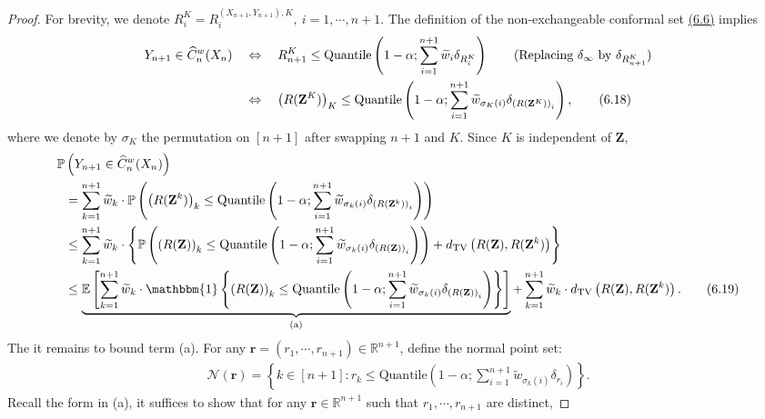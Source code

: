 \documentclass{article}
\numberwithin{equation}{section}
\begin{document}
\begin{proof}
For brevity, we denote $R_i^K = R_i^{(X_{n+1},Y_{n+1}),K},\ i=1,\cdots, n+1.$ The definition of the non-exchangeable conformal set \hyperref[6.6]{(6.6)} implies
\begin{align*}
	Y_{n+1}\in \widehat{C}_n^w(X_n)\quad&\Leftrightarrow\quad R_{n+1}^{K}\leq \mathrm{Quantile}\left(1-\alpha;\sum_{i=1}^{n+1}\widetilde{w}_i\delta_{R_i^K}\right)\tag{Replacing $\delta_\infty$ by $\delta_{R_{n+1}^K}$}\\
	&\Leftrightarrow\quad \left(R(\mathbf{Z}^K)\right)_K \leq\mathrm{Quantile}\left(1-\alpha;\sum_{i=1}^{n+1}\widetilde{w}_{\sigma_K(i)}\delta_{\left(R(\mathbf{Z}^K)\right)_i}\right),\tag{6.18}\label{6.18}
\end{align*}
where we denote by $\sigma_K$ the permutation on $[n+1]$ after swapping $n+1$ and $K$. Since $K$ is independent of $\mathbf{Z}$,
\begin{align*}
	\mathbb{P}&\left(Y_{n+1}\in \widehat{C}_n^w(X_n)\right)\\
	&= \sum_{k=1}^{n+1}\widetilde{w}_k\cdot\mathbb{P}\left(\left(R(\mathbf{Z}^k)\right)_k \leq\mathrm{Quantile}\left(1-\alpha;\sum_{i=1}^{n+1}\widetilde{w}_{\sigma_k(i)}\delta_{\left(R(\mathbf{Z}^k)\right)_i}\right)\right)\\
	&\leq \sum_{k=1}^{n+1}\widetilde{w}_k\cdot\left\{\mathbb{P}\left(\left(R(\mathbf{Z})\right)_k \leq\mathrm{Quantile}\left(1-\alpha;\sum_{i=1}^{n+1}\widetilde{w}_{\sigma_k(i)}\delta_{\left(R(\mathbf{Z})\right)_i}\right)\right) + d_\mathrm{TV}\left(R(\mathbf{Z}),R(\mathbf{Z}^k)\right)\right\}\\
	&\leq \underbrace{\mathbb{E}\left[\sum_{k=1}^{n+1}\widetilde{w}_k\cdot\mathbbm{1}\left\{\left(R(\mathbf{Z})\right)_k \leq\mathrm{Quantile}\left(1-\alpha;\sum_{i=1}^{n+1}\widetilde{w}_{\sigma_k(i)}\delta_{\left(R(\mathbf{Z})\right)_i}\right)\right\}\right]}_{\mathrm{(a)}} +
	\sum_{k=1}^{n+1}\widetilde{w}_k\cdot d_\mathrm{TV}\left(R(\mathbf{Z}),R(\mathbf{Z}^k)\right).\tag{6.19}
\end{align*}
The it remains to bound term (a). For any $\mathbf{r}=(r_1,\cdots,r_{n+1})\in\mathbb{R}^{n+1}$, define the normal point set:
\begin{align*}
	\mathcal{N}(\mathbf{r}) = \left\{k\in[n+1]:r_k \leq \mathrm{Quantile}\left(1-\alpha;\sum_{i=1}^{n+1}\widetilde{w}_{\sigma_k(i)}\delta_{r_i}\right)\right\}.\tag{6.20}\label{6.20}
\end{align*}
Recall the form in (a), it suffices to show that for any $\mathbf{r}\in\mathbb{R}^{n+1}$ such that $r_1,\cdots,r_{n+1}$ are distinct,

\end{proof}
\end{document}
